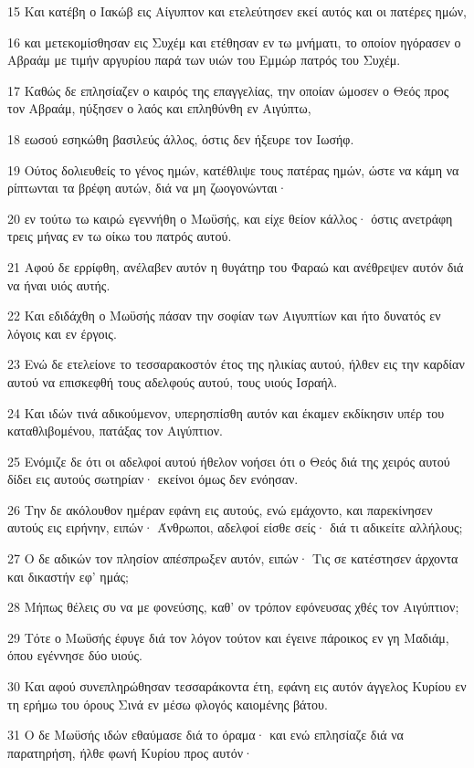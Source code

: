 \par 15 Και κατέβη ο Ιακώβ εις Αίγυπτον και ετελεύτησεν εκεί αυτός και οι πατέρες ημών,
\par 16 και μετεκομίσθησαν εις Συχέμ και ετέθησαν εν τω μνήματι, το οποίον ηγόρασεν ο Αβραάμ με τιμήν αργυρίου παρά των υιών του Εμμώρ πατρός του Συχέμ.
\par 17 Καθώς δε επλησίαζεν ο καιρός της επαγγελίας, την οποίαν ώμοσεν ο Θεός προς τον Αβραάμ, ηύξησεν ο λαός και επληθύνθη εν Αιγύπτω,
\par 18 εωσού εσηκώθη βασιλεύς άλλος, όστις δεν ήξευρε τον Ιωσήφ.
\par 19 Ούτος δολιευθείς το γένος ημών, κατέθλιψε τους πατέρας ημών, ώστε να κάμη να ρίπτωνται τα βρέφη αυτών, διά να μη ζωογονώνται·
\par 20 εν τούτω τω καιρώ εγεννήθη ο Μωϋσής, και είχε θείον κάλλος· όστις ανετράφη τρεις μήνας εν τω οίκω του πατρός αυτού.
\par 21 Αφού δε ερρίφθη, ανέλαβεν αυτόν η θυγάτηρ του Φαραώ και ανέθρεψεν αυτόν διά να ήναι υιός αυτής.
\par 22 Και εδιδάχθη ο Μωϋσής πάσαν την σοφίαν των Αιγυπτίων και ήτο δυνατός εν λόγοις και εν έργοις.
\par 23 Ενώ δε ετελείονε το τεσσαρακοστόν έτος της ηλικίας αυτού, ήλθεν εις την καρδίαν αυτού να επισκεφθή τους αδελφούς αυτού, τους υιούς Ισραήλ.
\par 24 Και ιδών τινά αδικούμενον, υπερησπίσθη αυτόν και έκαμεν εκδίκησιν υπέρ του καταθλιβομένου, πατάξας τον Αιγύπτιον.
\par 25 Ενόμιζε δε ότι οι αδελφοί αυτού ήθελον νοήσει ότι ο Θεός διά της χειρός αυτού δίδει εις αυτούς σωτηρίαν· εκείνοι όμως δεν ενόησαν.
\par 26 Την δε ακόλουθον ημέραν εφάνη εις αυτούς, ενώ εμάχοντο, και παρεκίνησεν αυτούς εις ειρήνην, ειπών· Άνθρωποι, αδελφοί είσθε σείς· διά τι αδικείτε αλλήλους;
\par 27 Ο δε αδικών τον πλησίον απέσπρωξεν αυτόν, ειπών· Τις σε κατέστησεν άρχοντα και δικαστήν εφ' ημάς;
\par 28 Μήπως θέλεις συ να με φονεύσης, καθ' ον τρόπον εφόνευσας χθές τον Αιγύπτιον;
\par 29 Τότε ο Μωϋσής έφυγε διά τον λόγον τούτον και έγεινε πάροικος εν γη Μαδιάμ, όπου εγέννησε δύο υιούς.
\par 30 Και αφού συνεπληρώθησαν τεσσαράκοντα έτη, εφάνη εις αυτόν άγγελος Κυρίου εν τη ερήμω του όρους Σινά εν μέσω φλογός καιομένης βάτου.
\par 31 Ο δε Μωϋσής ιδών εθαύμασε διά το όραμα· και ενώ επλησίαζε διά να παρατηρήση, ήλθε φωνή Κυρίου προς αυτόν·
